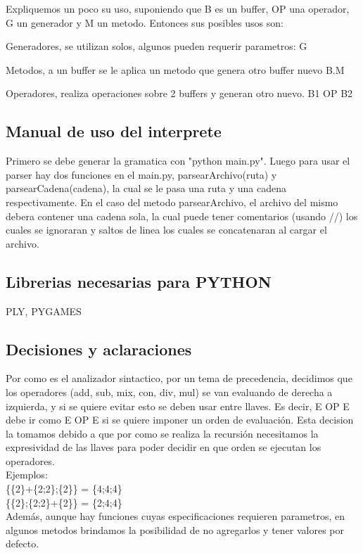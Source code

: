 \documentclass[a4paper,titlepage,10pt]{article}
\begin{document}
Expliquemos un poco su uso, suponiendo que B es un buffer, OP una operador, G un generador y M un metodo. Entonces sus posibles usos son:

Generadores, se utilizan solos, algunos pueden requerir parametros:
G

Metodos, a un buffer se le aplica un metodo que genera otro buffer nuevo
B.M

Operadores, realiza operaciones sobre 2 buffers y generan otro nuevo.
B1 OP B2



\subsection{Manual de uso del interprete}
Primero se debe generar la gramatica con "python main.py". Luego para usar el parser hay dos funciones en el main.py, parsearArchivo(ruta) y parsearCadena(cadena), la cual se le pasa una ruta y una cadena respectivamente.
En el caso del metodo parsearArchivo, el archivo del mismo debera contener una cadena sola, la cual puede tener comentarios (usando //) los cuales se ignoraran y saltos de linea los cuales se concatenaran al cargar el archivo.


\subsection{Librerias necesarias para PYTHON}
PLY, PYGAMES

\subsection{Decisiones y aclaraciones}
Por como es el analizador sintactico, por un tema de precedencia, decidimos que los operadores (add, sub, mix, con, div, mul) se van evaluando de derecha a izquierda, y si se quiere evitar esto se deben usar entre llaves. 
Es decir, E OP E debe ir como {E OP E} si se quiere imponer un orden de evaluación.
Esta decision la tomamos debido a que por como se realiza la recursión necesitamos la expresividad de las llaves para poder decidir en que orden se ejecutan los operadores.\\
Ejemplos: \\
\{\{2\}+\{2;2\};\{2\}\} = \{4;4;4\}\\
\{\{2\};\{2;2\}+\{2\}\} = \{2;4;4\}\\


Además, aunque hay funciones cuyas especificaciones requieren parametros, en algunos metodos brindamos la posibilidad de no agregarlos y tener valores por defecto.
\end{document}
